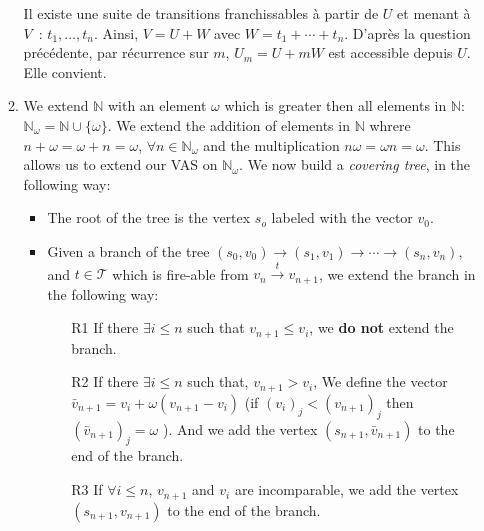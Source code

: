 \documentclass[a4paper,11pt]{exam}
\newcommand{\N}{\mathbb{N}}
\begin{document}
\begin{questions}
\begin{enumerate}
\begin{enumerate}
				
				\begin{solution}
					Il existe une suite de transitions franchissables à partir de $U$
					et menant à $V$~: $t_1, \dots, t_n$.
					Ainsi, $V = U + W$ avec $W = t_1 + \cdots + t_n$.
					D'après la question précédente, par récurrence sur
					$m$, $U_m = U + mW$ est accessible depuis $U$. Elle convient.
				\end{solution}
				
				\item We extend $\N$ with an element $\omega$ which is greater then all elements in $\N$: $\N_\omega=\N\cup\{\omega\}$.
				We extend the addition of elements in $\N$ whrere $n+\omega=\omega + n=\omega$,  $\forall n\in \N_\omega$ and the multiplication $n \omega=\omega n=\omega$. This allows us to extend our VAS on $\N_\omega$. 
				We now build a \textit{covering tree}, in the following way:
				\begin{itemize}
					\item The root of the tree is the vertex $s_o$ labeled with the vector $v_0$.
					\item Given a branch of the tree $(s_0,v_0)\to (s_1,v_1) \to \cdots
					\to (s_n,v_n)$, and $t\in \mathcal{T}$ which is fire-able from $v_n
					\stackrel{t}{\to} v_{n+1}$, we extend the branch in the following way:
					\begin{itemize}
						\item[R1] If there $\exists i \leq n$ such that $v_{n+1} \leq v_i$, we {\bf do not} extend the branch.
						\item[R2] If there $\exists i \leq n$ such that, $v_{n+1} >v_i$, We define the vector $\bar{v}_{n+1}= v_i + \omega (v_{n+1} -v_i)$ (if $(v_i)_j < (v_{n+1})_j$ then $(\bar{v}_{n+1})_j=\omega $ ). And we add the vertex $(s_{n+1},\bar{v}_{n+1})$ to the end of the branch.
						\item[R3] If $\forall i \leq n$, $v_{n+1}$ and  $ v_i$ are incomparable, we add the vertex $(s_{n+1},v_{n+1})$ to the end of the branch.
					\end{itemize}
				\end{itemize}
				

\end{enumerate}
\end{enumerate}
\end{questions}
\end{document}
